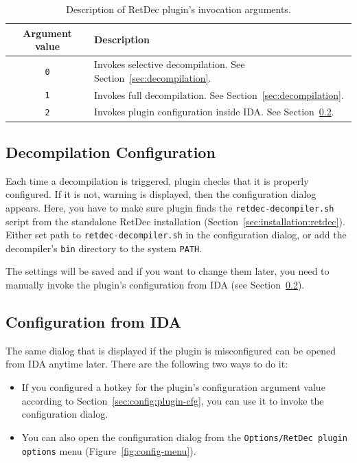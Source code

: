 \documentclass[pdftex, a4paper,12pt, oneside, svgnames]{article}
\begin{document}
\begin{table}[!ht]
\centering
\caption{Description of RetDec plugin's invocation arguments.}
\label{table:plugin-args}
\begin{tabular}{cl}
\textbf{Argument value} & \textbf{Description}\\
\hline
\texttt{0} & Invokes selective decompilation. See Section~\ref{sec:decompilation}. \\
\texttt{1} & Invokes full decompilation. See Section~\ref{sec:decompilation}. \\
\texttt{2} & Invokes plugin configuration inside IDA. See Section~\ref{sec:config:from-ida}.
\end{tabular}
\end{table}

\subsection{Decompilation Configuration}
Each time a decompilation is triggered, plugin checks that it is properly configured. If it is not, warning is displayed, then the configuration dialog appears. Here, you have to make sure plugin finds the \texttt{retdec-decompiler.sh} script from the standalone RetDec installation (Section~\ref{sec:installation:retdec}). Either set path to \texttt{retdec-decompiler.sh} in the configuration dialog, or add the decompiler's \texttt{bin} directory to the system \texttt{PATH}.

The settings will be saved and if you want to change them later, you need to manually invoke the plugin's configuration from IDA (see Section~\ref{sec:config:from-ida}).

\subsection{Configuration from IDA}
\label{sec:config:from-ida}
The same dialog that is displayed if the plugin is misconfigured can be opened from IDA anytime later. There are the following two ways to do it:
\begin{itemize}
	\item If you configured a hotkey for the plugin's configuration argument value according to Section~\ref{sec:config:plugin-cfg}, you can use it to invoke the configuration dialog.
	\item You can also open the configuration dialog from the \texttt{Options/RetDec plugin options} menu (Figure~\ref{fig:config-menu}).
\end{itemize}
\end{document}
